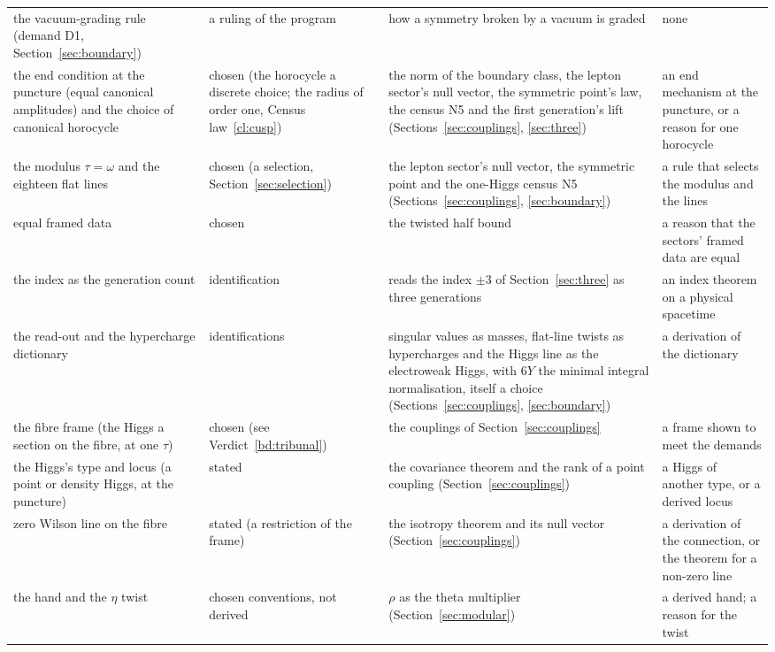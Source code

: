 {\begin{longtable}{@{}p{3.2cm}p{2.4cm}p{3.6cm}p{6.0cm}@{}}
the vacuum-grading rule (demand D1, Section~\ref{sec:boundary}) & a ruling of the program & how a symmetry broken by a vacuum is graded & none\\
the end condition at the puncture (equal canonical amplitudes) and the choice of canonical horocycle & chosen (the horocycle a discrete choice; the radius of order one, Census law~\ref{cl:cusp}) & the norm of the boundary class, the lepton sector's null vector, the symmetric point's law, the census N5 and the first generation's lift (Sections~\ref{sec:couplings}, \ref{sec:three}) & an end mechanism at the puncture, or a reason for one horocycle\\
the modulus $\tau=\omega$ and the eighteen flat lines & chosen (a selection, Section~\ref{sec:selection}) & the lepton sector's null vector, the symmetric point and the one-Higgs census N5 (Sections~\ref{sec:couplings}, \ref{sec:boundary}) & a rule that selects the modulus and the lines\\
equal framed data & chosen & the twisted half bound & a reason that the sectors' framed data are equal\\
the index as the generation count & identification & reads the index $\pm3$ of Section~\ref{sec:three} as three generations & an index theorem on a physical spacetime\\
the read-out and the hypercharge dictionary & identifications & singular values as masses, flat-line twists as hypercharges and the Higgs line as the electroweak Higgs, with $6Y$ the minimal integral normalisation, itself a choice (Sections~\ref{sec:couplings}, \ref{sec:boundary}) & a derivation of the dictionary\\
the fibre frame (the Higgs a section on the fibre, at one $\tau$) & chosen (see Verdict~\ref{bd:tribunal}) & the couplings of Section~\ref{sec:couplings} & a frame shown to meet the demands\\
the Higgs's type and locus (a point or density Higgs, at the puncture) & stated & the covariance theorem and the rank of a point coupling (Section~\ref{sec:couplings}) & a Higgs of another type, or a derived locus\\
zero Wilson line on the fibre & stated (a restriction of the frame) & the isotropy theorem and its null vector (Section~\ref{sec:couplings}) & a derivation of the connection, or the theorem for a non-zero line\\
the hand and the $\eta$ twist & chosen conventions, not derived & $\rho$ as the theta multiplier (Section~\ref{sec:modular}) & a derived hand; a reason for the twist\\

\end{longtable}}
